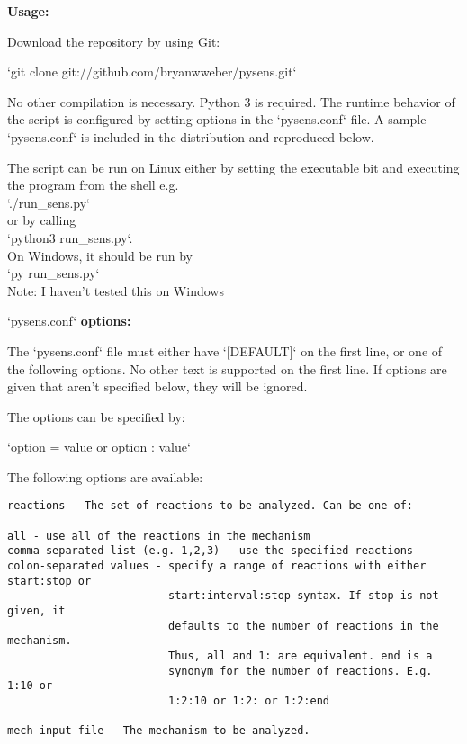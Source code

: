 
\begin{singlespace}
{\setlength{\parindent}{0pt}
\DefineShortVerb[commandchars=\\\{\}]{\`}
{\large \textbf{Usage:}}

Download the repository by using Git: 

`git clone git://github.com/bryanwweber/pysens.git`

No other compilation is necessary. Python 3 is required.
The runtime behavior of the script is configured by setting options in
the `pysens.conf` file. A sample `pysens.conf` is included in the
distribution and reproduced below.

The script can be run on Linux either by setting the executable bit
and executing the program from the shell e.g.\\
`./run_sens.py`\\
or by calling\\
`python3 run_sens.py`.\\
On Windows, it should be run by\\
`py run_sens.py`\\
Note: I haven't tested this on Windows

\blankline

{\large `pysens.conf` \textbf{options:}}

The `pysens.conf` file must either have `[DEFAULT]` on the first line,
or one of the following options. No other text is supported on the first
line. If options are given that aren't specified below, they will be
ignored.

The options can be specified by:

`option = value or option : value`

The following options are available:

\begin{Verbatim}
reactions - The set of reactions to be analyzed. Can be one of:

all - use all of the reactions in the mechanism
comma-separated list (e.g. 1,2,3) - use the specified reactions
colon-separated values - specify a range of reactions with either start:stop or
                         start:interval:stop syntax. If stop is not given, it
                         defaults to the number of reactions in the mechanism.
                         Thus, all and 1: are equivalent. end is a
                         synonym for the number of reactions. E.g. 1:10 or
                         1:2:10 or 1:2: or 1:2:end

mech input file - The mechanism to be analyzed.


\end{Verbatim}}
\end{singlespace}
